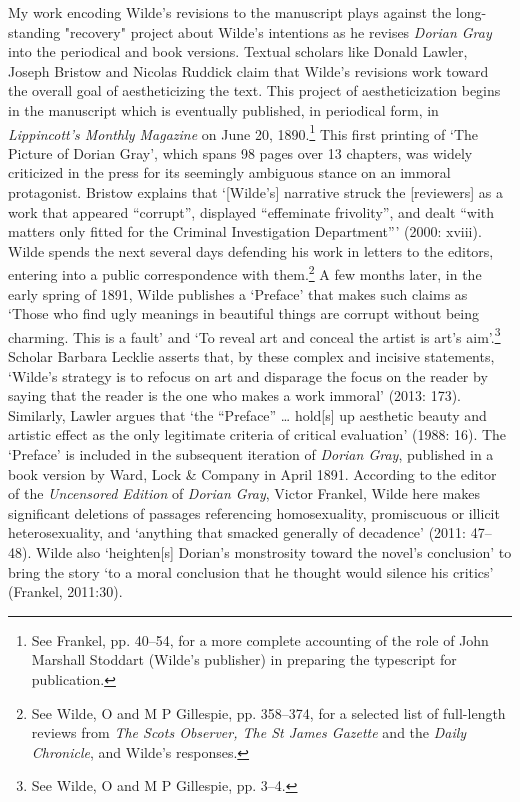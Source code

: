 \documentclass[11pt]{article}
\begin{document}
My work encoding Wilde's revisions to the manuscript plays against the
long-standing "recovery" project about Wilde's intentions as he
revises \emph{Dorian Gray} into the periodical and book versions. Textual
scholars like Donald Lawler, Joseph Bristow and Nicolas Ruddick claim
that Wilde's revisions work toward the overall goal of aestheticizing
the text. This project of aestheticization begins in the manuscript
which is eventually published, in periodical form, in \emph{Lippincott's
Monthly Magazine} on June 20, 1890.\footnote{See Frankel, pp. 40–54, for a more complete accounting of the
role of John Marshall Stoddart (Wilde’s publisher) in preparing the
typescript for publication.} This first printing of ‘The
Picture of Dorian Gray', which spans 98 pages over 13 chapters, was
widely criticized in the press for its seemingly ambiguous stance on
an immoral protagonist. Bristow explains that ‘[Wilde's] narrative
struck the [reviewers] as a work that appeared “corrupt”, displayed
“effeminate frivolity”, and dealt “with matters only fitted for the
Criminal Investigation Department”' (2000: xviii). Wilde spends the
next several days defending his work in letters to the editors,
entering into a public correspondence with them.\footnote{See Wilde, O and M P Gillespie, pp. 358--374, for a selected list of
full-length reviews from \emph{The Scots Observer, The St James Gazette} and
the \emph{Daily Chronicle}, and Wilde's responses.} A few months
later, in the early spring of 1891, Wilde publishes a ‘Preface' that
makes such claims as ‘Those who find ugly meanings in beautiful things
are corrupt without being charming. This is a fault' and ‘To reveal
art and conceal the artist is art's aim'.\footnote{See Wilde, O and M P Gillespie, pp. 3--4.} Scholar Barbara
Lecklie asserts that, by these complex and incisive statements,
‘Wilde's strategy is to refocus on art and disparage the focus on the
reader by saying that the reader is the one who makes a work immoral'
(2013: 173). Similarly, Lawler argues that ‘the “Preface” \ldots{} hold[s]
up aesthetic beauty and artistic effect as the only legitimate
criteria of critical evaluation' (1988: 16). The ‘Preface' is included
in the subsequent iteration of \emph{Dorian Gray}, published in a book
version by Ward, Lock \& Company in April 1891. According to the editor
of the \emph{Uncensored Edition} of \emph{Dorian Gray}, Victor Frankel, Wilde
here makes significant deletions of passages referencing
homosexuality, promiscuous or illicit heterosexuality, and ‘anything
that smacked generally of decadence' (2011: 47--48). Wilde also
‘heighten[s] Dorian's monstrosity toward the novel's conclusion' to
bring the story ‘to a moral conclusion that he thought would silence
his critics' (Frankel, 2011:30).
\end{document}

